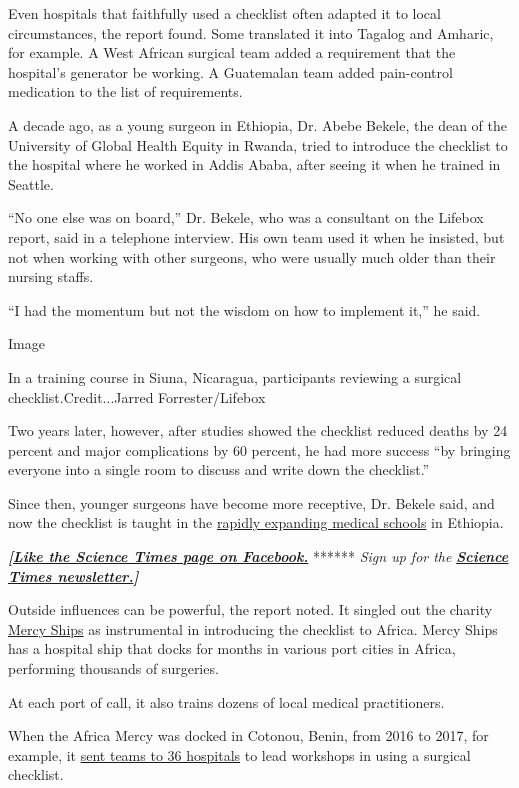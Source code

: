 Even hospitals that faithfully used a checklist often adapted it to
local circumstances, the report found. Some translated it into Tagalog
and Amharic, for example. A West African surgical team added a
requirement that the hospital's generator be working. A Guatemalan team
added pain-control medication to the list of requirements.

A decade ago, as a young surgeon in Ethiopia, Dr. Abebe Bekele, the dean
of the University of Global Health Equity in Rwanda, tried to introduce
the checklist to the hospital where he worked in Addis Ababa, after
seeing it when he trained in Seattle.

``No one else was on board,'' Dr. Bekele, who was a consultant on the
Lifebox report, said in a telephone interview. His own team used it when
he insisted, but not when working with other surgeons, who were usually
much older than their nursing staffs.

``I had the momentum but not the wisdom on how to implement it,'' he
said.

Image

In a training course in Siuna, Nicaragua, participants reviewing a
surgical checklist.Credit...Jarred Forrester/Lifebox

Two years later, however, after studies showed the checklist reduced
deaths by 24 percent and major complications by 60 percent, he had more
success ``by bringing everyone into a single room to discuss and write
down the checklist.''

Since then, younger surgeons have become more receptive, Dr. Bekele
said, and now the checklist is taught in the
\href{https://www.pri.org/stories/2012-12-20/ethiopias-crowded-medical-schools}{rapidly
expanding medical schools} in Ethiopia.

\textbf{\emph{{[}}\href{http://on.fb.me/1paTQ1h}{\emph{Like the Science
Times page on Facebook.}}} ****** \emph{\textbar{} Sign up for the}
\textbf{\href{http://nyti.ms/1MbHaRU}{\emph{Science Times
newsletter.}}\emph{{]}}}

Outside influences can be powerful, the report noted. It singled out the
charity \href{https://www.mercyships.org/}{Mercy Ships} as instrumental
in introducing the checklist to Africa. Mercy Ships has a hospital ship
that docks for months in various port cities in Africa, performing
thousands of surgeries.

At each port of call, it also trains dozens of local medical
practitioners.

When the Africa Mercy was docked in Cotonou, Benin, from 2016 to 2017,
for example, it
\href{https://www.mercyships.org.uk/who-checklist-success-in-benin/}{sent
teams to 36 hospitals} to lead workshops in using a surgical checklist.

